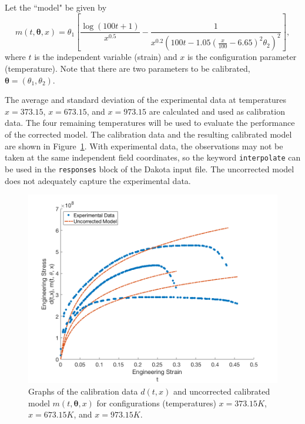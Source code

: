 Let the ``model" be given by
\begin{equation}
m(t, \boldsymbol{\theta}, x) = \theta_{1} \left[ \frac{\log(100t + 1)}{x^0.5}
  - \frac{1}{x^{0.2}\left(100t - 1.05\left(\frac{x}{100} - 6.65\right)^{2}
\theta_{2}\right)^{2}} \right],
\end{equation}
where $t$ is the independent variable (strain) and $x$ is the configuration 
parameter (temperature). Note that there are two parameters to be calibrated,
$\boldsymbol{\theta} = (\theta_{1}, \theta_{2})$. 

The average and standard deviation of the experimental data at temperatures 
$x = 373.15$, $x = 673.15$, and $x = 973.15$ are calculated and used as
calibration data. The four remaining temperatures
will be used to evaluate the performance of the corrected model. The 
calibration data and the resulting calibrated model are shown in 
Figure~\ref{fig:mat_uncorr}. With experimental data, the observations may not 
be taken at the same independent field coordinates, so the keyword 
\texttt{interpolate} can be used in the \texttt{responses} block of the Dakota 
input file. The uncorrected model does not adequately capture the experimental
data.

\begin{figure}[b!]
\begin{center}
\includegraphics[width=.6\textwidth]{images/moddiscrep_ExpUncorr.png}
\end{center}
\vspace{-0.5cm}
\caption{Graphs of the calibration data $d(t,x)$ and uncorrected calibrated
  model $m(t, \boldsymbol{\theta}, x)$ for configurations (temperatures) $x = 
373.15K$, $x = 673.15K$, and $x = 973.15K$.}
\label{fig:mat_uncorr}
\end{figure}

